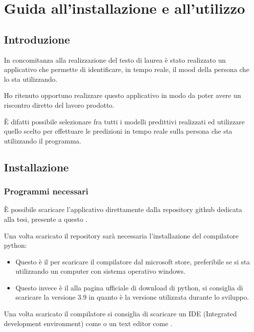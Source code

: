 \chapter{Guida all’installazione e all’utilizzo}
\section{Introduzione}
In concomitanza alla realizzazione del testo di laurea è stato realizzato un applicativo che permette di identificare, in tempo reale, il mood della persona che lo sta utilizzando.

Ho ritenuto opportuno realizzare questo applicativo in modo da poter avere un riscontro diretto del lavoro prodotto.

È difatti possibile selezionare fra tutti i modelli predittivi realizzati ed utilizzare quello scelto per effettuare le predizioni in tempo reale sulla persona che sta utilizzando il programma.

\section {Installazione}
\subsection{Programmi necessari}
È possibile scaricare l’applicativo direttamente dalla repository github dedicata alla tesi, presente a questo \href{https://github.com/AlessandroCarella/bachelor-s-thesis}{}.

Una volta scaricato il repository sarà necessaria l’installazione del compilatore python:
\begin{itemize}
\item Questo è il \href{https://www.microsoft.com/store/productId/9P7QFQMJRFP7}{} per scaricare il compilatore dal microsoft store, preferibile se si sta utilizzando un computer con sistema operativo windows.
\item Questo invece è il \href{https://www.python.org/downloads/}{} alla pagina ufficiale di download di python, si consiglia di scaricare la versione 3.9 in quanto è la versione utilizzata durante lo sviluppo.
\end{itemize}

Una volta scaricato il compilatore si consiglia di scaricare un IDE (Integrated development environment) come \href{https://www.jetbrains.com/pycharm/}{} o un text editor come \href{https://code.visualstudio.com/}{}.


